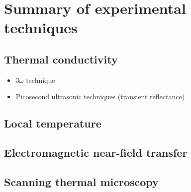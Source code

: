 




\iffalse
\section{Summary of experimental techniques}

\subsection{Thermal conductivity}

\begin{itemize}
 \item $3\omega$ technique
 \item Picosecond ultrasonic techniques (transient reflectance)
\end{itemize}

\subsection{Local temperature}

\subsection{Electromagnetic near-field transfer}

\subsection{Scanning thermal microscopy}

